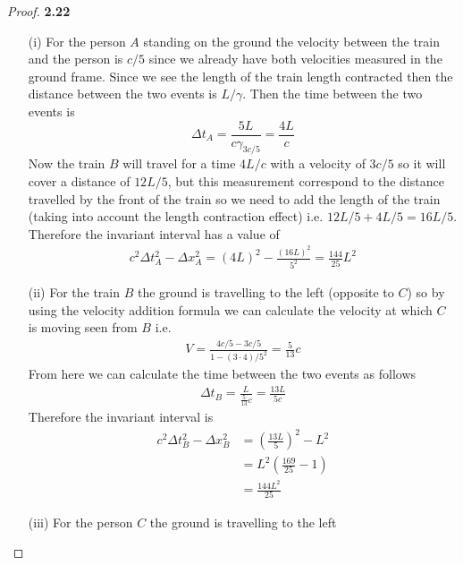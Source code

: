 \documentclass[11pt]{article}
\theoremstyle{definition}
\begin{document}
	\begin{proof}{\textbf{2.22}}
        \begin{itemize}
            \item [(i)] For the person $A$ standing on the ground the velocity between
            the train and the person is $c/5$ since we already have both velocities
            measured in the ground frame. Since we see the length of the train length
            contracted then the distance between the two events is $L/\gamma$. Then
            the time between the two events is
            $$\Delta t_A = \frac{5L}{c\gamma_{3c/5}} = \frac{4L}{c}$$
            Now the train $B$ will travel for a time $4L/c$ with a velocity of
            $3c/5$ so it will cover a distance of $12L/5$, but this measurement
            correspond to the distance travelled by the front of the train so we need to
            add the length of the train (taking into account the length contraction
            effect) i.e. $12L/5 + 4L/5 = 16L/5$. Therefore the invariant interval has a
            value of
            \begin{align*}
                c^2\Delta t_A^2 - \Delta x_A^2 = (4L)^2 - \frac{(16L)^2}{5^2}
                =  \frac{144}{25}L^2
            \end{align*}
            \item [(ii)] For the train $B$ the ground is travelling to the left (opposite
            to $C$) so by using the velocity addition formula we can calculate the
            velocity at which $C$ is moving seen from $B$ i.e.
            \begin{align*}
                V = \frac{4c/5 - 3c/5}{1 - (3\cdot 4)/5^2} = \frac{5}{13}c 
            \end{align*}
            From here we can calculate the time between the two events as follows
            \begin{align*}
                \Delta t_B = \frac{L}{\frac{5}{13}c} = \frac{13L}{5c}
            \end{align*}
            Therefore the invariant interval is
            \begin{align*}
                c^2\Delta t_B^2 - \Delta x_B^2 &= (\frac{13L}{5})^2 - L^2\\
                    &= L^2(\frac{169}{25} -1)\\
                    &= \frac{144 L^2}{25}
            \end{align*}
            \item [(iii)] For the person $C$ the ground is travelling to the left

\end{itemize}
\end{proof}
\end{document}
